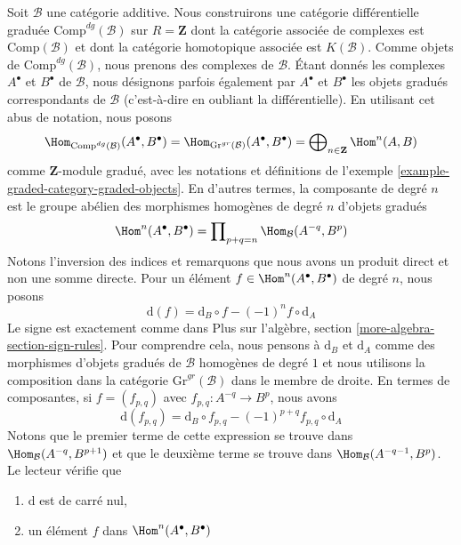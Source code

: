 \begin{example}
\label{example-category-complexes}
Soit $\mathcal{B}$ une catégorie additive. Nous construirons une
catégorie différentielle graduée $\text{Comp}^{dg}(\mathcal{B})$ sur $R
= \mathbf{Z}$ dont la catégorie associée de complexes est
$\text{Comp}(\mathcal{B})$ et dont la catégorie homotopique associée est
$K(\mathcal{B})$. Comme objets de $\text{Comp}^{dg}(\mathcal{B})$, nous prenons des
complexes de $\mathcal{B}$. Étant donnés les complexes
$A^\bullet$ et $B^\bullet$ de $\mathcal{B}$, nous désignons parfois également par
$A^\bullet$ et $B^\bullet$ les objets gradués correspondants de
$\mathcal{B}$ (c'est-à-dire en oubliant la différentielle). En utilisant
cet abus de notation, nous posons
$$
\Hom_{\text{Comp}^{dg}(\mathcal{B})}(A^\bullet, B^\bullet) =
\Hom_{\text{Gr}^{gr}(\mathcal{B})}(A^\bullet, B^\bullet) =
\bigoplus\nolimits_{n \in \mathbf{Z}} \Hom^n(A, B)
$$
comme $\mathbf{Z}$-module gradué, avec les notations et définitions
de l'exemple \ref{example-graded-category-graded-objects}. En
d'autres termes, la composante de degré $n$
est le groupe abélien des morphismes homogènes de degré $n$ d'objets gradués
$$
\Hom^n(A^\bullet, B^\bullet) =
\prod\nolimits_{p + q = n} \Hom_\mathcal{B}(A^{-q}, B^p)
$$
Notons l'inversion des indices et remarquons que nous avons un produit
direct et non une somme directe. Pour un
élément $f \in \Hom^n(A^\bullet, B^\bullet)$ de degré $n$, nous posons
$$
\text{d}(f) = \text{d}_B \circ f - (-1)^n f \circ \text{d}_A
$$
Le signe est exactement
comme dans Plus sur l'algèbre, section
\ref{more-algebra-section-sign-rules}. Pour comprendre cela, nous pensons à $\text{d}_B$ et $\text{d}_A$
comme des morphismes d'objets gradués de $\mathcal{B}$ homogènes de degré $1$ et
nous utilisons la composition dans la catégorie $\text{Gr}^{gr}(\mathcal{B})$
dans le membre de droite. En termes de composantes, si $f = (f_{p, q})$ avec
$f_{p, q} : A^{-q} \to B^p$, nous avons
\begin{equation}
\label{equation-differential-hom-complex}
\text{d}(f_{p, q}) =
\text{d}_B \circ f_{p, q} - (-1)^{p + q} f_{p, q} \circ \text{d}_A
\end{equation}
Notons que le premier terme de cette expression se trouve
dans $\Hom_\mathcal{B}(A^{-q}, B^{p + 1})$ et que le deuxième terme se
trouve dans $\Hom_\mathcal{B}(A^{-q - 1}, B^p)$. Le lecteur vérifie que
\begin{enumerate}
\item $\text{d}$ est de carré nul,
\item un élément $f$ dans $\Hom^n(A^\bullet, B^\bullet)$

\end{enumerate}
\end{example}
